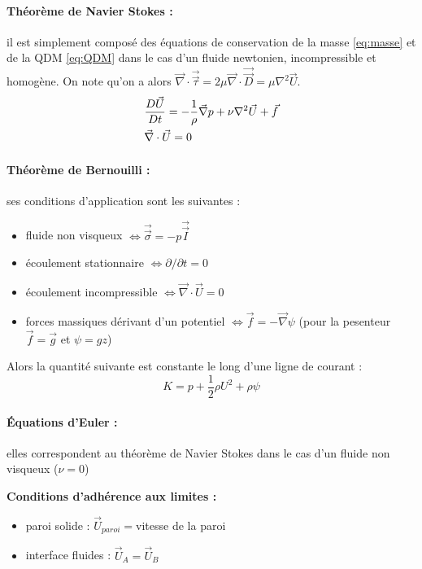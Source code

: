 \paragraph{Théorème de Navier Stokes :}il est simplement composé des équations de conservation de la masse \eqref{eq:masse} et de la QDM \eqref{eq:QDM} dans le cas d'un fluide newtonien, incompressible et homogène. On note qu'on a alors $\vec{\nabla} \cdot \vec{\vec{\tau}} = 2 \mu \vec{\nabla} \cdot \vec{\vec{D}} = \mu \nabla^2 \vec{U}$.
%
\begin{align}[left=\empheqlbrace]
 & \frac{D\vec{U}}{Dt} = - \frac{1}{\rho} \vec{\nabla} p + \nu  \nabla^2 \vec{U} + \vec{f} \\
 \notag & \vec{\nabla} \cdot \vec{U} = 0
\label{eq:navierstokes}
\end{align}


\paragraph{Théorème de Bernouilli :}ses conditions d'application sont les suivantes :

\begin{itemize}
    \item fluide non visqueux
    $\Leftrightarrow \vec{\vec{\sigma}}=-p\vec{\vec{I}}$
    \item écoulement stationnaire
    $\Leftrightarrow \partial{}/\partial{t} = 0$
    \item écoulement incompressible
    $\Leftrightarrow \vec{\nabla} \cdot \vec{U} = 0$
    \item forces massiques dérivant d'un potentiel
    $\Leftrightarrow\vec{f} = - \vec{\nabla} \psi$ (pour la pesenteur $\vec{f} = \vec{g}$ et $\psi = g z$)
\end{itemize}
%
Alors la quantité suivante est constante le long d'une ligne de courant :
%
\begin{equation}
K = p + \frac{1}{2}\rho U^2 + \rho\psi
\label{eq:bernouilli}
\end{equation}

\paragraph{Équations d'Euler :}elles correspondent au théorème de Navier Stokes dans le cas d'un fluide non visqueux ($\nu=0$)

\textbf{Conditions d'adhérence aux limites :}
\begin{itemize}
    \item paroi solide : $\vec{U}_{paroi}=$vitesse de la paroi
    \item interface fluides : $\vec{U}_A=\vec{U}_B$
\end{itemize}

